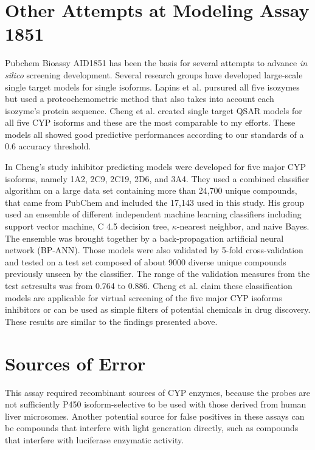 
\section{Other Attempts at Modeling Assay 1851}
Pubchem Bioassy AID1851 has been the basis for several attempts to advance \textit{in silico} screening development. Several research groups have developed large-scale single target models for single isoforms. \cite{Vasanthanathan2009} \cite{Sridhar2012} \cite{Sun2012} \cite{Novotarskyi2010} Lapins et al. pursured all five isozymes but used a proteochemometric method that also takes into account each isozyme's protein sequence. \cite{Lapins2013} Cheng et al. created single target QSAR models for all five CYP isoforms and these are the most comparable to my efforts. \cite{Cheng2011} These models all showed good predictive performances according to our standards of a 0.6 accuracy threshold.

In Cheng's study inhibitor predicting models were developed for five major CYP isoforms, namely 1A2, 2C9, 2C19, 2D6, and 3A4. They used a combined classifier algorithm on a large data set containing more than 24,700 unique compounds, that came from PubChem and included the 17,143 used in this study. His group used an ensemble of different independent machine learning classifiers including support vector machine, C 4.5 decision tree, $\kappa$-nearest neighbor, and naive Bayes. The ensemble was brought together by a back-propagation artificial neural network (BP-ANN). Those models were also validated by 5-fold cross-validation  and tested on a test set composed of about 9000 diverse unique compounds previously unseen by the classifier. The range of the validation measures from the test setresults was from 0.764 to 0.886. Cheng et al. claim these classification models are applicable for virtual screening of the five major CYP isoforms inhibitors or can be used as simple filters of potential chemicals in drug discovery. \cite{Cheng2011} These results are similar to the findings presented above.


\section{Sources of Error}
This assay required recombinant sources of CYP enzymes, because the probes are not sufficiently P450 isoform-selective to be used with those derived from human liver microsomes. Another potential source for false positives in these assays can be compounds that interfere with light generation directly, such as compounds that interfere with luciferase enzymatic activity. \cite{Zlokarnik2005}

